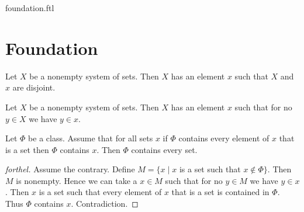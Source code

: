 \documentclass{naproche-library}
\begin{document}
\begin{smodule}{foundation.ftl}

  \section{Foundation}

  \begin{axiom}[forthel,title=Foundation,id=FOUNDATIONS_10_1320008569323520]
    Let $X$ be a nonempty system of sets.
    Then $X$ has an element $x$ such that $X$ and $x$ are disjoint.
  \end{axiom}
  
  \begin{corollary}[forthel,id=FOUNDATIONS_10_9532145874510315]
    Let $X$ be a nonempty system of sets.
    Then $X$ has an element $x$ such that for no $y \in X$ we have $y \in x$.
  \end{corollary}
  
  \begin{proposition}[forthel,id=FOUNDATIONS_11_2812087589928960]
    Let $\Phi$ be a class.
    Assume that for all sets $x$ if $\Phi$ contains every element of $x$ that is a set then $\Phi$ contains $x$.
    Then $\Phi$ contains every set.
  \end{proposition}
  \begin{proof}[forthel]
    Assume the contrary.
    Define $M = \{ x \mid x$ is a set such that $x \notin \Phi \}$.
    Then $M$ is nonempty.
    Hence we can take a $x \in M$ such that for no $y \in M$ we have $y \in x$.
    Then $x$ is a set such that every element of $x$ that is a set is contained in $\Phi$.
    Thus $\Phi$ contains $x$.
    Contradiction.
  \end{proof}
\end{smodule}
\end{document}
